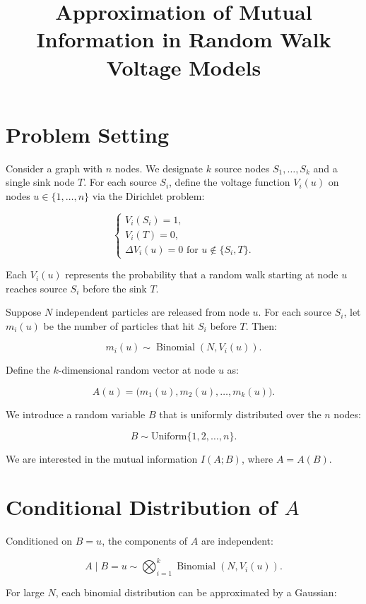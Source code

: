 \documentclass[11pt]{article}
\title{Approximation of Mutual Information in Random Walk Voltage Models}
\author{}
\date{}
\begin{document}
\maketitle

\section*{Problem Setting}

Consider a graph with $n$ nodes. We designate $k$ source nodes $S_1, \ldots, S_k$ and a single sink node $T$. For each source $S_i$, define the voltage function $V_i(u)$ on nodes $u \in \{1, \ldots, n\}$ via the Dirichlet problem:

\[
\begin{cases}
V_i(S_i) = 1, \\
V_i(T) = 0, \\
\Delta V_i(u) = 0 \text{ for } u \notin \{S_i, T\}.
\end{cases}
\]

Each $V_i(u)$ represents the probability that a random walk starting at node $u$ reaches source $S_i$ before the sink $T$.

\bigskip

Suppose $N$ independent particles are released from node $u$. For each source $S_i$, let $m_i(u)$ be the number of particles that hit $S_i$ before $T$. Then:

\[
m_i(u) \sim \operatorname{Binomial}(N, V_i(u)).
\]

Define the $k$-dimensional random vector at node $u$ as:

\[
A(u) = \big(m_1(u), m_2(u), \ldots, m_k(u)\big).
\]

We introduce a random variable $B$ that is uniformly distributed over the $n$ nodes:

\[
B \sim \text{Uniform} \{1, 2, \ldots, n\}.
\]

We are interested in the mutual information $I(A; B)$, where $A = A(B)$.

\section*{Conditional Distribution of $A$}

Conditioned on $B = u$, the components of $A$ are independent:

\[
A \mid B = u \sim \bigotimes_{i=1}^k \operatorname{Binomial}(N, V_i(u)).
\]

For large $N$, each binomial distribution can be approximated by a Gaussian:
\end{document}
